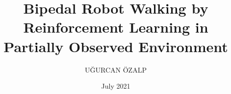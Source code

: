 \documentclass[chaparabic,sc,ms,12pt,oneandhalf]{metu_iam}
\author{UĞURCAN ÖZALP}
\title{Bipedal Robot Walking by Reinforcement Learning in Partially Observed Environment}
\date{July 2021} %
\theoremstyle{definition}
\begin{document}
\begin{preliminaries}
\end{preliminaries}
%   
% 



























%
%
\appendix
%
%
%
%
%
\end{document}
